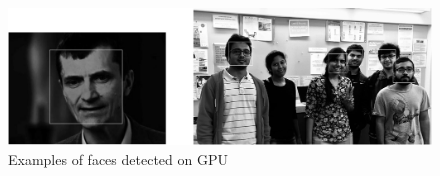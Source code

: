 \begin{figure}[h]
  \centering
  \includegraphics[width=\linewidth]{figs/face_detected_crop.pdf}
  \caption{Examples of faces detected on GPU}
  \label{fig:detect}
\end{figure}



